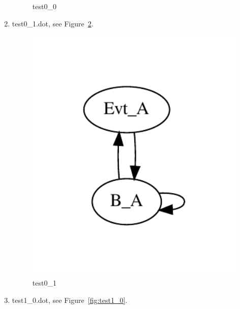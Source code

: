 \documentclass[12pt,a4paper]{report}
\begin{document}
\begin{enumerate}
\begin{figure}
        \caption{test0\_0}
        \label{fig:test0_0}
    \end{figure}
\item test0\_1.dot, see Figure~\ref{fig:test0_1}.
    \begin{figure}
        \centering 
        \includegraphics*[width=1.0\textwidth,keepaspectratio]{TestPattern/test0_1.pdf}
        \caption{test0\_1}
        \label{fig:test0_1}
    \end{figure}
\item test1\_0.dot, see Figure~\ref{fig:test1_0}.
    \begin{figure}
        \centering 

\end{figure}
\end{enumerate}
\end{document}
